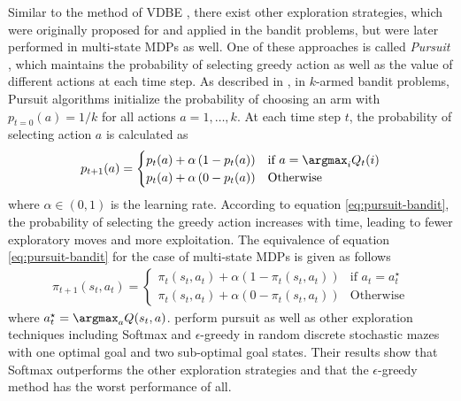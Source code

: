 Similar to the method of VDBE , there exist other exploration strategies, which were originally proposed for and applied in the bandit problems, but were later performed in multi-state MDPs as well. One of these approaches is called \emph{Pursuit} , which maintains the probability of selecting greedy action as well as the value of different actions at each time step. As described in , in $k$-armed bandit problems, Pursuit algorithms initialize the probability of choosing an arm with $p_{t=0}(a)=1/k$ for all actions $a=1,\dots,k$. At each time step $t$, the probability of selecting action $a$ is calculated as
\begin{align}
p_{t+1}(a)=\begin{cases}
p_t(a)+\alpha\left(1-p_t(a)\right) & \text{if $a=\argmax_iQ_t(i)$}\\
p_t(a)+\alpha\left(0-p_t(a)\right) & \text{Otherwise}\label{eq:pursuit-bandit}
\end{cases}
\end{align}
where $\alpha\in(0,1)$ is the learning rate. According to equation \ref{eq:pursuit-bandit}, the probability of selecting the greedy action increases with time, leading to fewer exploratory moves and more exploitation. The equivalence of equation \ref{eq:pursuit-bandit} for the case of multi-state MDPs is given as follows 
\begin{align}
\pi_{t+1}(s_t,a_{t})=\begin{cases}
\pi_t(s_t,a_{t})+\alpha\left(1-\pi_t(s_t,a_t)\right) & \text{if $a_t=a^\star_t$}\\
\pi_t(s_t,a_t)+\alpha\left(0-\pi_t(s_t,a_t)\right) & \text{Otherwise}\label{eq:pursuit-RL}
\end{cases}
\end{align}
where $a^\star_t=\argmax_aQ(s_t,a)$.  perform pursuit as well as other exploration techniques including Softmax and $\epsilon$-greedy in random discrete stochastic mazes with one optimal goal and two sub-optimal goal states. Their results show that Softmax outperforms the other exploration strategies and that the $\epsilon$-greedy method has the worst performance of all.


